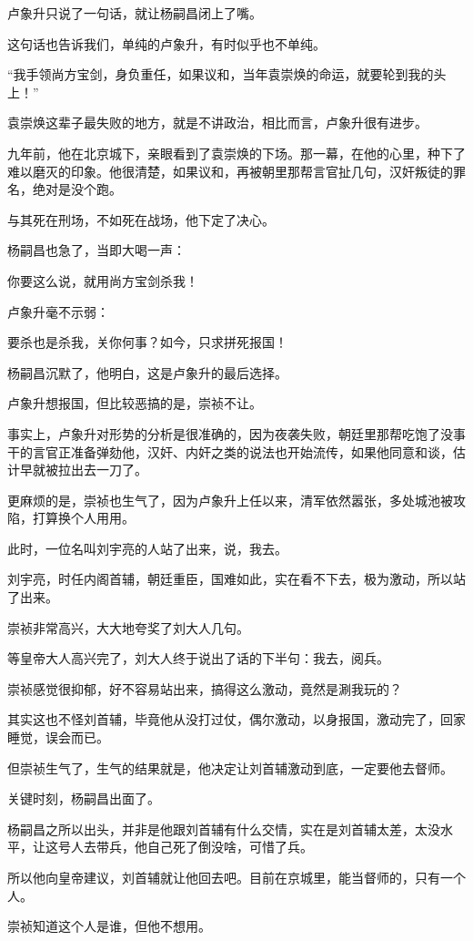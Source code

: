 \begin{multicols}{\theparacolNo}
卢象升只说了一句话，就让杨嗣昌闭上了嘴。

这句话也告诉我们，单纯的卢象升，有时似乎也不单纯。

“我手领尚方宝剑，身负重任，如果议和，当年袁崇焕的命运，就要轮到我的头上！”

袁崇焕这辈子最失败的地方，就是不讲政治，相比而言，卢象升很有进步。

九年前，他在北京城下，亲眼看到了袁崇焕的下场。那一幕，在他的心里，种下了难以磨灭的印象。他很清楚，如果议和，再被朝里那帮言官扯几句，汉奸叛徒的罪名，绝对是没个跑。

与其死在刑场，不如死在战场，他下定了决心。

杨嗣昌也急了，当即大喝一声：

你要这么说，就用尚方宝剑杀我！

卢象升毫不示弱：

要杀也是杀我，关你何事？如今，只求拼死报国！

杨嗣昌沉默了，他明白，这是卢象升的最后选择。

卢象升想报国，但比较恶搞的是，崇祯不让。

事实上，卢象升对形势的分析是很准确的，因为夜袭失败，朝廷里那帮吃饱了没事干的言官正准备弹劾他，汉奸、内奸之类的说法也开始流传，如果他同意和谈，估计早就被拉出去一刀了。

更麻烦的是，崇祯也生气了，因为卢象升上任以来，清军依然嚣张，多处城池被攻陷，打算换个人用用。

此时，一位名叫刘宇亮的人站了出来，说，我去。

刘宇亮，时任内阁首辅，朝廷重臣，国难如此，实在看不下去，极为激动，所以站了出来。

崇祯非常高兴，大大地夸奖了刘大人几句。

等皇帝大人高兴完了，刘大人终于说出了话的下半句：我去，阅兵。

崇祯感觉很抑郁，好不容易站出来，搞得这么激动，竟然是涮我玩的？

其实这也不怪刘首辅，毕竟他从没打过仗，偶尔激动，以身报国，激动完了，回家睡觉，误会而已。

但崇祯生气了，生气的结果就是，他决定让刘首辅激动到底，一定要他去督师。

关键时刻，杨嗣昌出面了。

杨嗣昌之所以出头，并非是他跟刘首辅有什么交情，实在是刘首辅太差，太没水平，让这号人去带兵，他自己死了倒没啥，可惜了兵。

所以他向皇帝建议，刘首辅就让他回去吧。目前在京城里，能当督师的，只有一个人。

崇祯知道这个人是谁，但他不想用。


\end{multicols}
